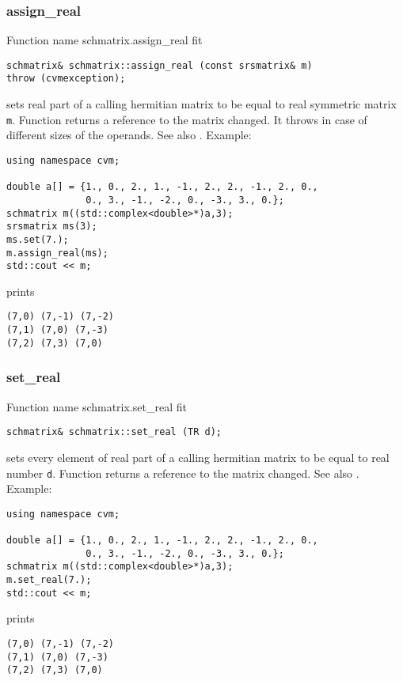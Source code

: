 \subsubsection{assign\_real}
Function%
\pdfdest name {schmatrix.assign_real} fit
\begin{verbatim}
schmatrix& schmatrix::assign_real (const srsmatrix& m) 
throw (cvmexception);
\end{verbatim}
sets real part of a calling hermitian matrix to be equal to
real symmetric matrix \verb"m".
Function returns a reference to
the matrix changed.
It throws  
in case of different sizes of the operands.
See also .
Example:
\begin{Verbatim}
using namespace cvm;

double a[] = {1., 0., 2., 1., -1., 2., 2., -1., 2., 0.,
              0., 3., -1., -2., 0., -3., 3., 0.};
schmatrix m((std::complex<double>*)a,3);
srsmatrix ms(3);
ms.set(7.);
m.assign_real(ms);
std::cout << m;
\end{Verbatim}
prints
\begin{Verbatim}
(7,0) (7,-1) (7,-2)
(7,1) (7,0) (7,-3)
(7,2) (7,3) (7,0)
\end{Verbatim}
\newpage



\subsubsection{set\_real}
Function%
\pdfdest name {schmatrix.set_real} fit
\begin{verbatim}
schmatrix& schmatrix::set_real (TR d);
\end{verbatim}
sets every element of  real part of a calling 
hermitian matrix to be equal to
 real number \verb"d".
Function returns a reference to
the matrix changed.
See also .
Example:
\begin{Verbatim}
using namespace cvm;

double a[] = {1., 0., 2., 1., -1., 2., 2., -1., 2., 0.,
              0., 3., -1., -2., 0., -3., 3., 0.};
schmatrix m((std::complex<double>*)a,3);
m.set_real(7.);
std::cout << m;
\end{Verbatim}
prints
\begin{Verbatim}
(7,0) (7,-1) (7,-2)
(7,1) (7,0) (7,-3)
(7,2) (7,3) (7,0)
\end{Verbatim}
\newpage




